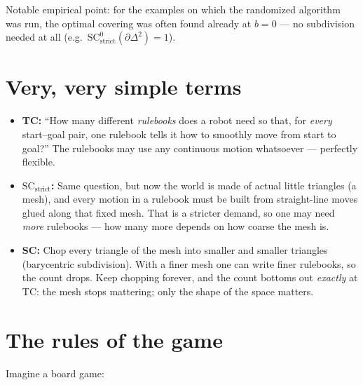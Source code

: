 \documentclass[11pt]{article}
\theoremstyle{definition}
\begin{document}
Notable empirical point: for the examples on which the randomized algorithm was
run, the optimal covering was often found already at $b = 0$ --- no subdivision
needed at all (e.g.\ $\mathrm{SC}^0_{\mathrm{strict}}(\partial\Delta^2) = 1$).

\section{Very, very simple terms}

\begin{itemize}
  \item \textbf{TC:} ``How many different \emph{rulebooks} does a robot need so
  that, for \emph{every} start--goal pair, one rulebook tells it how to smoothly
  move from start to goal?'' The rulebooks may use any continuous motion
  whatsoever --- perfectly flexible.
  \item \textbf{$\mathrm{SC}_{\mathrm{strict}}$:} Same question, but now the
  world is made of actual little triangles (a mesh), and every motion in a
  rulebook must be built from straight-line moves glued along that fixed mesh.
  That is a stricter demand, so one may need \emph{more} rulebooks --- how many
  more depends on how coarse the mesh is.
  \item \textbf{SC:} Chop every triangle of the mesh into smaller and smaller
  triangles (barycentric subdivision). With a finer mesh one can write finer
  rulebooks, so the count drops. Keep chopping forever, and the count bottoms
  out \emph{exactly} at TC: the mesh stops mattering; only the shape of the
  space matters.
\end{itemize}

\section{The rules of the game}

Imagine a board game:
\end{document}
